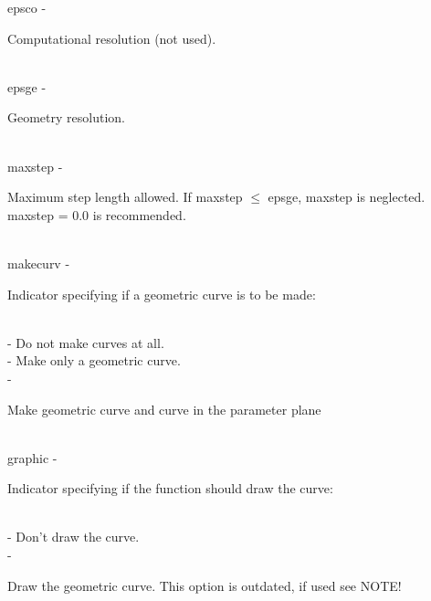         \>\>    {\fov epsco}\> - \>     \begin{minipg2}
                                Computational resolution (not used).
                                \end{minipg2}\\
        \>\>    {\fov epsge}\> - \>     \begin{minipg2}
                                Geometry resolution.
                                \end{minipg2}\\
        \>\>    {\fov maxstep}\> - \>   \begin{minipg2}
                                Maximum step length allowed. If maxstep $\leq$ epsge,
                                maxstep is neglected. maxstep = 0.0 is recommended.
                                \end{minipg2}\\[0.8ex]
        \>\>    {\fov makecurv}\> - \>          \begin{minipg2}
                                Indicator specifying if a geometric curve is to be made:
                                \end{minipg2}\\
                \>\>\>\> -     \>Do not make curves at all.\\
                \>\>\>\> -     \>Make only a geometric curve.\\
                \>\>\>\> -     \>\begin{minipg5}
                                        Make geometric curve and curve in the parameter
                                        plane
                                        \end{minipg5} \\[0.3ex]
        \>\>    {\fov graphic}\> - \>   \begin{minipg2}
                                Indicator specifying if the function
                                should draw the curve:
                                \end{minipg2}\\
                \>\>\>\> -     \>Don't draw the curve.\\
                \>\>\>\> -     \>\begin{minipg5}
                                        Draw the geometric curve. This option is
                                        outdated, if used see NOTE!
                                        \end{minipg5} \\[0.8ex]
